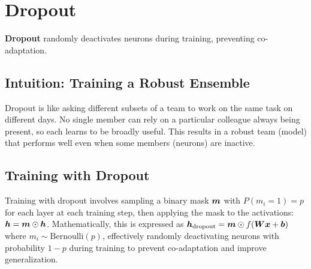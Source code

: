 
\section{Dropout }
\label{sec:dropout}

\textbf{Dropout} randomly deactivates neurons during training, preventing co-adaptation.

\subsection{Intuition: Training a Robust Ensemble}

Dropout is like asking different subsets of a team to work on the same task on different days. No single member can rely on a particular colleague always being present, so each learns to be broadly useful. This results in a robust team (model) that performs well even when some members (neurons) are inactive.

\subsection{Training with Dropout}

Training with dropout involves sampling a binary mask $\boldsymbol{m}$ with $P(m_i = 1) = p$ for each layer at each training step, then applying the mask to the activations: $\boldsymbol{h} = \boldsymbol{m} \odot \boldsymbol{h}$. Mathematically, this is expressed as $\boldsymbol{h}_{\text{dropout}} = \boldsymbol{m} \odot f(\boldsymbol{W}\boldsymbol{x} + \boldsymbol{b})$ where $m_i \sim \text{Bernoulli}(p)$, effectively randomly deactivating neurons with probability $1-p$ during training to prevent co-adaptation and improve generalization.

